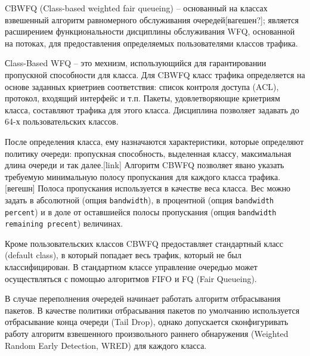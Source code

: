 
    CBWFQ (Class-based weighted fair queueing) -- основанный на классах взвешенный алгоритм равномерного обслуживания 
    очередей[вагешен?]; является расширением функциональности дисциплины обслуживания WFQ,
	основанной на потоках, для предоставления определяемых пользователями классов трафика. 

	Сlass-Based WFQ -- это мехнизм, использующийся для гарантировании пропускной способности
	для класса. Для CBWFQ класс трафика определяется на основе заданных криетриев
	соответствия: список контроля доступа (ACL), протокол, входящий интерфейс и т.п. Пакеты,
	удовлетворяющие криетриям класса, составляют трафика для этого класса. Дисциплина
	позволяет задавать до 64-х пользовательских классов.

	После определения класса, ему назначаются характеристики, которые определяют
	политику очереди: пропускная способность, выделенная классу, максимальная
	длина очереди и так далее.[link] Алгоритм CBWFQ позволяет явано указать требуемую минимальную
	полосу пропускания для каждого класса трафика.[вегешн] Полоса пропускания используется
	в качестве веса класса. Вес можно задать в абсолютной (опция \texttt{bandwidth}),
	в процентной (опция \texttt{bandwidth percent}) и в доле от оставшиейся
	полосы пропускания (опция \texttt{bandwidth remaining precent}) величинах.

	Кроме пользовательских классов CBWFQ предоставляет стандартный класс (default class),
	в который попадает весь трафик, который не был классифицирован. В стандартном классе
	управление очередью может осуществляться с помощью алгоритмов FIFO и FQ (Fair Queueing). 

	В случае переполнения очередей начинает работать алгоритм отбрасывания пакетов.
	В качестве политики отбрасывания пакетов по умолчанию используется отбрасывание конца
	очереди (Tail Drop), однако допускается сконфигуривать работу
	алгоритм взвешенного произвольного раннего обнаружения (Weighted Random Early Detection, WRED)
	для каждого класса.

